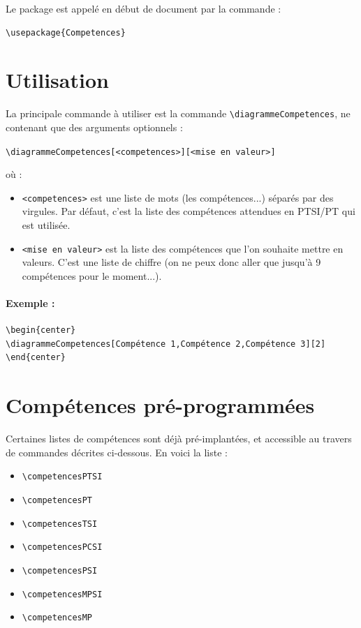 \documentclass[a4paper,12pt]{article}
\begin{document}
		Le package est appelé en début de document par la commande :
		\begin{verbatim}
\usepackage{Competences}
		\end{verbatim}

	\section{Utilisation}
	
	La principale commande à utiliser est la commande \verb!\diagrammeCompetences!, ne contenant que des arguments optionnels :
	\begin{center}
		\verb!\diagrammeCompetences[<competences>][<mise en valeur>]!
	\end{center}
 	où :
	\begin{itemize}
		\item\verb!<competences>! est une liste de mots (les compétences...) séparés par des virgules.
					Par défaut, c'est la liste des compétences attendues en PTSI/PT qui est utilisée.
		\item\verb!<mise en valeur>! est la liste des compétences que l'on souhaite mettre en valeurs. C'est une liste de chiffre (on ne peux donc aller que jusqu'à 9 compétences pour le moment...).
	\end{itemize}

	\paragraph{Exemple :}
	\begin{verbatim}
\begin{center}
\diagrammeCompetences[Compétence 1,Compétence 2,Compétence 3][2]
\end{center}
	\end{verbatim}

\begin{center}
\end{center}



	\section{Compétences pré-programmées}

		Certaines listes de compétences sont déjà pré-implantées, et accessible au travers de commandes décrites ci-dessous. En voici la liste :
		\begin{itemize}
			\item \verb!\competencesPTSI!
			\item \verb!\competencesPT!
			\item \verb!\competencesTSI!
			\item \verb!\competencesPCSI!
			\item \verb!\competencesPSI!
			\item \verb!\competencesMPSI!
			\item \verb!\competencesMP!
		\end{itemize}
\end{document}
